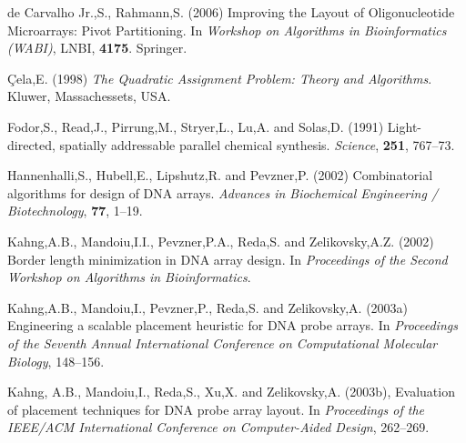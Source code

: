 \documentclass[english]{lni}
\newcommand{\ignore}[1]{}
\begin{document}
\begin{thebibliography}{9}

\ignore{
\bibitem{BINDER05} Binder,H. and Preibisch,S. (2005)
Specific and nonspecific hybridization of oligonucleotide probes on microarrays.
{\it Biophysical Journal}, {\bf 89}, 337--352.
}

 de Carvalho Jr.,S., Rahmann,S. (2006)
Improving the Layout of Oligonucleotide Microarrays: Pivot Partitioning.
In {\it Workshop on Algorithms in Bioinformatics (WABI)}, LNBI, {\bf 4175}.
Springer.

 \c{C}ela,E. (1998) {\it The Quadratic
Assignment Problem: Theory and Algorithms}. Kluwer, Massachessets, USA.
\ignore{
\bibitem{CHASE76} Chase,P.J. (1976) Subsequence numbers and
logarithmic concavity. {\it Discrete Mathematics} {\bf 16}, 123--140.
\bibitem{FELDMAN93} Feldman,W. and Pevzner,P. (1994)
Gray code masks for sequencing by hibridization. {\it Genomics}, {\bf 23},
233--235.
\bibitem{FEO95} Feo,T.A. and Resende,M.G.C. (1995) Greedy
randomized adaptive search procedures. {\it Journal of Global Optimization},
{\bf 6}, 109--133.
}

 Fodor,S., Read,J., Pirrung,M.,
Stryer,L., Lu,A. and Solas,D. (1991) Light-directed, spatially addressable
parallel chemical synthesis. {\it Science}, {\bf 251}, 767--73.

 Hannenhalli,S.,
Hubell,E., Lipshutz,R. and Pevzner,P. (2002) Combinatorial algorithms for design
of DNA arrays. {\it Advances in Biochemical Engineering / Biotechnology},
{\bf 77}, 1--19.

 Kahng,A.B., Mandoiu,I.I.,
Pevzner,P.A., Reda,S. and Zelikovsky,A.Z. (2002) Border length minimization in
DNA array design. In {\it Proceedings of the Second Workshop on Algorithms in
Bioinformatics}.

 Kahng,A.B., Mandoiu,I.,
Pevzner,P., Reda,S. and Zelikovsky,A. (2003a) Engineering a scalable placement
heuristic for DNA probe arrays. In {\it Proceedings of the Seventh Annual
International Conference on Computational Molecular Biology}, 148--156.

 Kahng, A.B., Mandoiu,I., Reda,S.,
Xu,X. and Zelikovsky,A. (2003b), Evaluation of placement techniques for DNA
probe array layout. In {\it Proceedings of the IEEE/ACM International Conference
on Computer-Aided Design}, 262--269.


\end{thebibliography}
\end{document}
